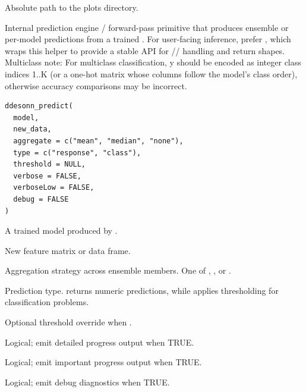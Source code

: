 \documentclass[a4paper]{book}
\begin{document}
%
\begin{Value}
Absolute path to the plots directory.
\end{Value}
%
\begin{Description}
Internal prediction engine / forward-pass primitive that
produces ensemble or per-model predictions from a trained .
For user-facing inference, prefer , which wraps
this helper to provide a stable API for //
handling and return shapes.
Multiclass note: For multiclass classification, y should be encoded as integer class indices 1..K (or a one-hot matrix whose columns follow the model’s class order), otherwise accuracy comparisons may be incorrect.
\end{Description}
%
\begin{Usage}
\begin{verbatim}
ddesonn_predict(
  model,
  new_data,
  aggregate = c("mean", "median", "none"),
  type = c("response", "class"),
  threshold = NULL,
  verbose = FALSE,
  verboseLow = FALSE,
  debug = FALSE
)
\end{verbatim}
\end{Usage}
%
\begin{Arguments}
\begin{ldescription}
\item[\code{model}] A trained model produced by .

\item[\code{new\_data}] New feature matrix or data frame.

\item[\code{aggregate}] Aggregation strategy across ensemble members. One of
, , or .

\item[\code{type}] Prediction type.  returns numeric predictions,
while  applies thresholding for classification problems.

\item[\code{threshold}] Optional threshold override when .

\item[\code{verbose}] Logical; emit detailed progress output when TRUE.

\item[\code{verboseLow}] Logical; emit important progress output when TRUE.

\item[\code{debug}] Logical; emit debug diagnostics when TRUE.
\end{ldescription}
\end{Arguments}
\end{document}
